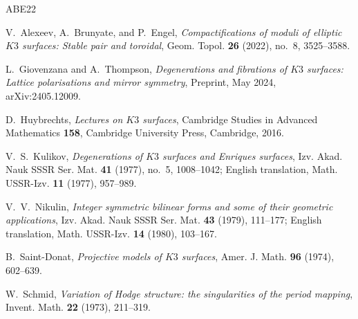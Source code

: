 \documentclass[11pt]{amsart}
\theoremstyle{definition}
\theoremstyle{remark}
\begin{document}
\begin{thebibliography}{ABE22}

V.~Alexeev, A.~Brunyate, and P.~Engel,
\emph{Compactifications of moduli of elliptic $K3$ surfaces: Stable pair and
toroidal},
Geom. Topol. \textbf{26} (2022), no.~8, 3525--3588.

L.~Giovenzana and A.~Thompson,
\emph{Degenerations and fibrations of $K3$ surfaces: Lattice polarisations and
mirror symmetry},
Preprint, May 2024, arXiv:2405.12009.

D.~Huybrechts,
\emph{Lectures on $K3$ surfaces},
Cambridge Studies in Advanced Mathematics \textbf{158},
Cambridge University Press, Cambridge, 2016.

V.~S.~Kulikov,
\emph{Degenerations of $K3$ surfaces and Enriques surfaces},
Izv. Akad. Nauk SSSR Ser. Mat. \textbf{41} (1977), no.~5, 1008--1042;
English translation, Math. USSR-Izv. \textbf{11} (1977), 957--989.

V.~V.~Nikulin,
\emph{Integer symmetric bilinear forms and some of their geometric
applications},
Izv. Akad. Nauk SSSR Ser. Mat. \textbf{43} (1979), 111--177;
English translation, Math. USSR-Izv. \textbf{14} (1980), 103--167.

B.~Saint-Donat,
\emph{Projective models of $K3$ surfaces},
Amer. J. Math. \textbf{96} (1974), 602--639.

W.~Schmid,
\emph{Variation of Hodge structure: the singularities of the period mapping},
Invent. Math. \textbf{22} (1973), 211--319.

\end{thebibliography}
\end{document}

